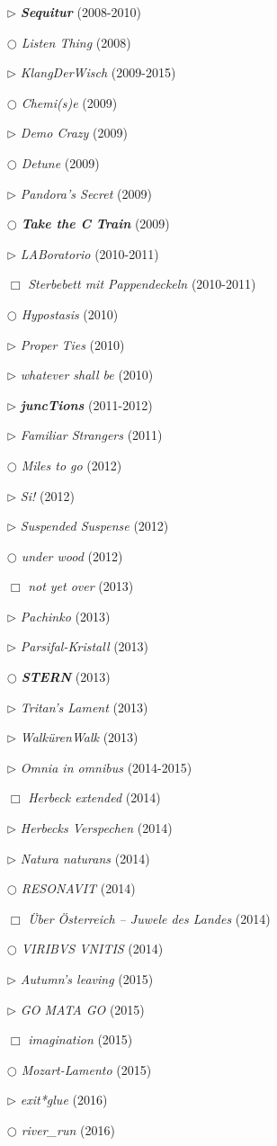 \documentclass[a4paper,12pt]{article}
\begin{document}
\begin{itemize}
\item[$\rhd$] \textbf{\emph{Sequitur}} (2008-2010)
\item[$\bigcirc$] \emph{Listen Thing} (2008)
\item[$\rhd$] \emph{KlangDerWisch} (2009-2015)
\item[$\bigcirc$] \emph{Chemi(s)e} (2009)
\item[$\rhd$] \emph{Demo Crazy} (2009)
\item[$\bigcirc$] \emph{Detune} (2009)
\item[$\rhd$] \emph{Pandora's Secret} (2009)
\item[$\bigcirc$] \textbf{\emph{Take the C Train}} (2009)
\item[$\rhd$] \emph{LABoratorio} (2010-2011)
\item[$\Box$] \emph{Sterbebett mit Pappendeckeln} (2010-2011)
\item[$\bigcirc$] \emph{Hypostasis} (2010)
\item[$\rhd$] \emph{Proper Ties} (2010)
\item[$\rhd$] \emph{whatever shall be} (2010)
\item[$\rhd$] \textbf{\emph{juncTions}} (2011-2012)
\item[$\rhd$] \emph{Familiar Strangers} (2011)
\item[$\bigcirc$] \emph{Miles to go} (2012)
\item[$\rhd$] \emph{Si!} (2012)
\item[$\rhd$] \emph{Suspended Suspense} (2012)
\item[$\bigcirc$] \emph{under wood} (2012)
\item[$\Box$] \emph{not yet over} (2013)
\item[$\rhd$] \emph{Pachinko} (2013)
\item[$\rhd$] \emph{Parsifal-Kristall} (2013)
\item[$\bigcirc$] \textbf{\emph{STERN}} (2013)
\item[$\rhd$] \emph{Tritan's Lament} (2013)
\item[$\rhd$] \emph{WalkürenWalk} (2013)
\item[$\rhd$] \emph{Omnia in omnibus} (2014-2015)
\item[$\Box$] \emph{Herbeck extended} (2014)
\item[$\rhd$] \emph{Herbecks Verspechen} (2014)
\item[$\rhd$] \emph{Natura naturans} (2014)
\item[$\bigcirc$] \emph{RESONAVIT} (2014)
\item[$\Box$] \emph{Über Österreich – Juwele des Landes} (2014)
\item[$\bigcirc$] \emph{VIRIBVS VNITIS} (2014)
\item[$\rhd$] \emph{Autumn's leaving} (2015)
\item[$\rhd$] \emph{GO MATA GO} (2015)
\item[$\Box$] \emph{imagination} (2015)
\item[$\bigcirc$] \emph{Mozart-Lamento} (2015)
\item[$\rhd$] \emph{exit*glue} (2016)
\item[$\bigcirc$] \emph{river\_run} (2016)
\end{itemize}
\end{document}
